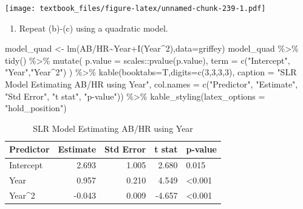\documentclass[
  11pt,
]{book}
\newenvironment{Shaded}{\begin{snugshade}}{\end{snugshade}}
\newcommand{\AttributeTok}[1]{\textcolor[rgb]{0.77,0.63,0.00}{#1}}
\newcommand{\DecValTok}[1]{\textcolor[rgb]{0.00,0.00,0.81}{#1}}
\newcommand{\FunctionTok}[1]{\textcolor[rgb]{0.00,0.00,0.00}{#1}}
\newcommand{\NormalTok}[1]{#1}
\newcommand{\OtherTok}[1]{\textcolor[rgb]{0.56,0.35,0.01}{#1}}
\newcommand{\SpecialCharTok}[1]{\textcolor[rgb]{0.00,0.00,0.00}{#1}}
\newcommand{\StringTok}[1]{\textcolor[rgb]{0.31,0.60,0.02}{#1}}
\providecommand{\tightlist}{%
  \setlength{\itemsep}{0pt}\setlength{\parskip}{0pt}}
\theoremstyle{definition}
\theoremstyle{definition}
\theoremstyle{definition}
\theoremstyle{definition}
\theoremstyle{remark}
\begin{document}
\texttt{[image: textbook\_files/figure-latex/unnamed-chunk-239-1.pdf]}

\newpage

\begin{enumerate}
\def\labelenumi{(\alph{enumi})}
\setcounter{enumi}{4}
\tightlist
\item
  Repeat (b)-(c) using a quadratic model.
\end{enumerate}

\begin{Shaded}
\begin{Highlighting}[]
\NormalTok{model\_quad }\OtherTok{\textless{}{-}} \FunctionTok{lm}\NormalTok{(}\StringTok{\textasciigrave{}}\AttributeTok{AB/HR}\StringTok{\textasciigrave{}}\SpecialCharTok{\textasciitilde{}}\NormalTok{Year}\SpecialCharTok{+}\FunctionTok{I}\NormalTok{(Year}\SpecialCharTok{\^{}}\DecValTok{2}\NormalTok{),}\AttributeTok{data=}\NormalTok{griffey)}
\NormalTok{model\_quad }\SpecialCharTok{\%\textgreater{}\%} \FunctionTok{tidy}\NormalTok{() }\SpecialCharTok{\%\textgreater{}\%}
  \FunctionTok{mutate}\NormalTok{(}
    \AttributeTok{p.value =}\NormalTok{ scales}\SpecialCharTok{::}\FunctionTok{pvalue}\NormalTok{(p.value),}
    \AttributeTok{term =} \FunctionTok{c}\NormalTok{(}\StringTok{"Intercept"}\NormalTok{, }\StringTok{"Year"}\NormalTok{,}\StringTok{"Year\^{}2"}\NormalTok{)}
\NormalTok{  ) }\SpecialCharTok{\%\textgreater{}\%}
  \FunctionTok{kable}\NormalTok{(}\AttributeTok{booktabs=}\NormalTok{T,}\AttributeTok{digits=}\FunctionTok{c}\NormalTok{(}\DecValTok{3}\NormalTok{,}\DecValTok{3}\NormalTok{,}\DecValTok{3}\NormalTok{,}\DecValTok{3}\NormalTok{), }
        \AttributeTok{caption =} \StringTok{"SLR Model Estimating AB/HR using Year"}\NormalTok{,}
        \AttributeTok{col.names =} \FunctionTok{c}\NormalTok{(}\StringTok{"Predictor"}\NormalTok{, }\StringTok{"Estimate"}\NormalTok{, }\StringTok{"Std Error"}\NormalTok{, }\StringTok{"t stat"}\NormalTok{, }\StringTok{"p{-}value"}\NormalTok{)) }\SpecialCharTok{\%\textgreater{}\%}
  \FunctionTok{kable\_styling}\NormalTok{(}\AttributeTok{latex\_options =} \StringTok{"hold\_position"}\NormalTok{)}
\end{Highlighting}
\end{Shaded}

\begin{table}[!h]

\caption{\label{tab:unnamed-chunk-240}SLR Model Estimating AB/HR using Year}
\centering
\begin{tabular}[t]{lrrrl}
\toprule
Predictor & Estimate & Std Error & t stat & p-value\\
\midrule
Intercept & 2.693 & 1.005 & 2.680 & 0.015\\
Year & 0.957 & 0.210 & 4.549 & <0.001\\
Year\textasciicircum{}2 & -0.043 & 0.009 & -4.657 & <0.001\\
\bottomrule
\end{tabular}
\end{table}
\end{document}
